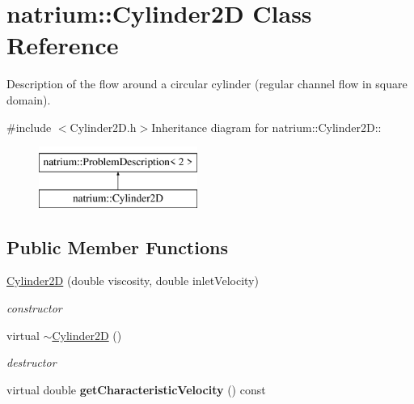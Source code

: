 \hypertarget{classnatrium_1_1Cylinder2D}{
\section{natrium::Cylinder2D Class Reference}
\label{classnatrium_1_1Cylinder2D}
}


Description of the flow around a circular cylinder (regular channel flow in square domain).  


{\ttfamily \#include $<$Cylinder2D.h$>$}Inheritance diagram for natrium::Cylinder2D::\begin{figure}[H]
\begin{center}
\leavevmode
\includegraphics[height=2cm]{classnatrium_1_1Cylinder2D}
\end{center}
\end{figure}
\subsection*{Public Member Functions}
\begin{DoxyCompactItemize}
\item 
\hyperlink{classnatrium_1_1Cylinder2D_a38e5826b6fd4fc859b74783de3999658}{Cylinder2D} (double viscosity, double inletVelocity)
\begin{DoxyCompactList}\small\item\em constructor \item\end{DoxyCompactList}\item 
\hypertarget{classnatrium_1_1Cylinder2D_a40a33168f7deb7f35e4eb7b3f749b4a3}{
virtual \hyperlink{classnatrium_1_1Cylinder2D_a40a33168f7deb7f35e4eb7b3f749b4a3}{$\sim$Cylinder2D} ()}
\label{classnatrium_1_1Cylinder2D_a40a33168f7deb7f35e4eb7b3f749b4a3}

\begin{DoxyCompactList}\small\item\em destructor \item\end{DoxyCompactList}\item 
\hypertarget{classnatrium_1_1Cylinder2D_a6e32e2b875af680163160779aca52134}{
virtual double {\bfseries getCharacteristicVelocity} () const }
\label{classnatrium_1_1Cylinder2D_a6e32e2b875af680163160779aca52134}

\end{DoxyCompactItemize}


